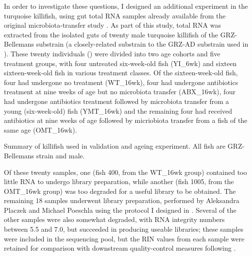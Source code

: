 In order to investigate these questions, I designed an additional \igseq experiment in the turquoise killifish, using gut total RNA samples already available from the original microbiota-transfer study \parencite{smith2017microbiota}. 
As part of this study, total RNA was extracted from the isolated guts of twenty male turquoise killifish of the GRZ-Bellemans substrain (a closely-related substrain to the GRZ-AD substrain used in ). These twenty individuals () were divided into two age cohorts and five treatment groups, with four untreated six-week-old fish (YI\_6wk) and sixteen sixteen-week-old fish in various treatment classes. Of the sixteen-week-old fish, four had undergone no treatment (WT\_16wk), four had undergone antibiotics treatment at nine weeks of age but no microbiota transfer (ABX\_16wk), four had undergone antibiotics treatment followed by microbiota transfer from a young (six-week-old) fish (YMT\_16wk) and the remaining four had received antibiotics at nine weeks of age followed by micriobiota transfer from a fish of the same age (OMT\_16wk).

\begin{table}[b]

\caption{Summary of killifish used in \igseq validation and ageing experiment. All fish are GRZ-Bellemans strain and male.}
\label{tab:gut-cohorts-summary}
\end{table}

Of these twenty samples, one (fish 400, from the WT\_16wk group) contained too little RNA to undergo \igseq library preparation, while another (fish 1005, from the OMT\_16wk group) was too degraded for a useful library to be obtained. The remaining 18 samples underwent \igseq library preparation, performed by Aleksandra Placzek and Michael Poeschla using the protocol I designed in . Several of the other samples were also somewhat degraded, with RNA integrity numbers between 5.5 and 7.0, but succeeded in producing useable libraries; these samples were included in the sequencing pool, but the RIN values from each sample were retained for comparison with downstream quality-control measures following \Igseq.


